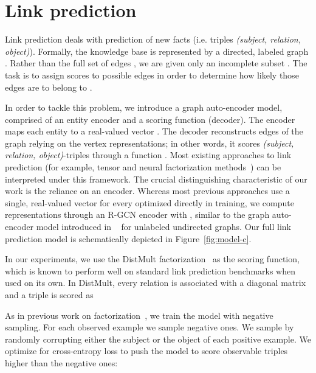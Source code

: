 \documentclass[letterpaper]{article} \usepackage{aaai18}  \usepackage{times}  \usepackage{helvet}  \usepackage{courier}  \usepackage{url}  \usepackage{graphicx}  \frenchspacing
\newcommand{\citet}[1]{\citeauthor{#1}~\shortcite{#1}}
\begin{document}
\section{Link prediction}\label{section:link_prediction}
Link prediction deals with prediction of new facts (i.e. triples \textit{(subject, relation, object)}). Formally, the knowledge base is represented by a directed, labeled graph . Rather than the full set of edges , we are given only an incomplete subset . The task is to assign scores  to possible edges  in order to determine how likely those edges are to belong to .

In order to tackle this problem, we introduce a graph auto-encoder model, comprised of an entity encoder and a scoring function (decoder). The encoder maps each entity  to a real-valued vector . The decoder reconstructs edges of the graph relying on the vertex representations; in other words, it scores \textit{(subject, relation, object)}-triples through a function . Most existing approaches to link prediction (for example, tensor and neural factorization methods~\cite{socher2013reasoning,lin2015modeling,toutanova2016compositional,distmult-embedding_entities_and_relations,complex-complex_embeddings_for_simple_link_prediction}) can be interpreted under this framework. The crucial distinguishing characteristic of our work is the reliance on an encoder. Whereas most previous approaches use a single, real-valued vector  for every  optimized directly in training, we compute representations through an R-GCN encoder with , similar to the graph auto-encoder model introduced in \citet{kipf2016variational} for unlabeled undirected graphs.
Our full link prediction model is schematically depicted in Figure~\ref{fig:model-c}.

In our experiments, we use the DistMult factorization~\cite{distmult-embedding_entities_and_relations} as the scoring function, which is known to perform well on standard link prediction benchmarks when used on its own.
In DistMult, every relation  is associated with a diagonal matrix  and a triple  is scored as


As in  previous work on factorization~\cite{distmult-embedding_entities_and_relations,complex-complex_embeddings_for_simple_link_prediction}, we train the model with negative sampling. For each observed example we sample  negative ones. We sample by randomly corrupting either the subject or the object of each positive example.
We optimize for cross-entropy loss to push the model to score observable triples higher than the negative ones:
\end{document}
